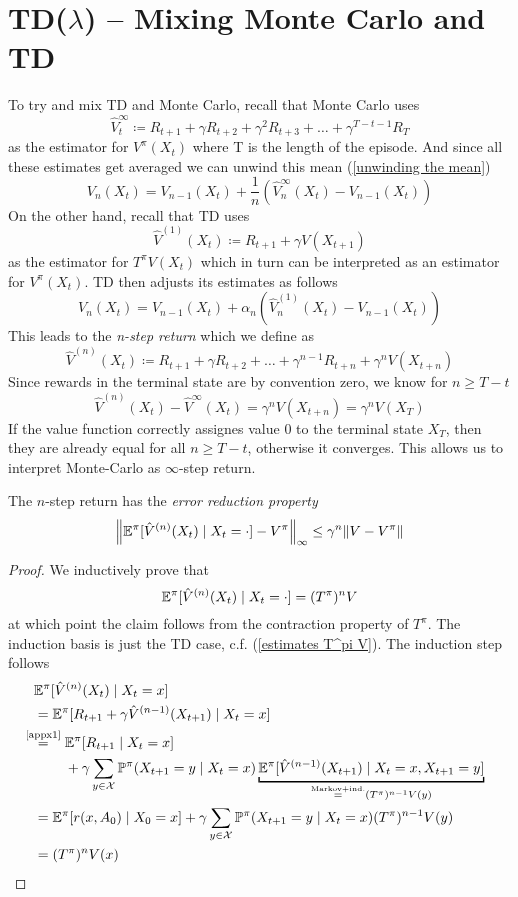 \section{TD(\(\lambda\)) --  Mixing Monte Carlo and TD} 
To try and mix TD and Monte Carlo, recall that Monte Carlo uses 
\[
	\hat{V}^\infty_t \coloneqq R_{t+1} + \gamma R_{t+2} + \gamma^2 R_{t+3} + \dotsc + \gamma^{T-t-1} R_T
\]
as the estimator for \(V^\pi(X_t)\) where T is the length of the episode. And since all these estimates get averaged we can unwind this mean (\ref{unwinding the mean})
\[
	V_n(X_t) = V_{n-1}(X_t) + \frac{1}{n}(\hat{V}_n^\infty (X_t)- V_{n-1}(X_t))
\]
On the other hand, recall that TD uses 
\[
	\hat{V}^{(1)}(X_t)\coloneqq R_{t+1} + \gamma V(X_{t+1})
\]
as the estimator for \(T^\pi V(X_t)\) which in turn can be interpreted as an estimator for \(V^\pi(X_t)\). TD then adjusts its estimates as follows
\[
	V_n(X_t)=V_{n-1}(X_t) + \alpha_n (\hat{V}_n^{(1)}(X_t) - V_{n-1}(X_t))
\]
This leads to the \emph{n-step return} which we define as 
\[
	\hat{V}^{(n)}(X_t)\coloneqq R_{t+1} +\gamma R_{t+2} + \dotsc + \gamma^{n-1}R_{t+n}+ \gamma^n V(X_{t+n})
\]
Since rewards in the terminal state are by convention zero, we know for \(n\ge T-t\)
\[
	\hat{V}^{(n)}(X_t)-\hat{V}^\infty(X_t) = \gamma^n V(X_{t+n}) = \gamma^n V(X_T)
\]
If the value function correctly assignes value \(0\) to the terminal state \(X_T\), then they are already equal for all \(n\ge T-t\), otherwise it converges. This allows us to interpret Monte-Carlo as \(\infty\)-step return.

\begin{lemma} The \(n\)-step return has the \emph{error reduction property}
	\[
		\left\| \mathbb{E}^\pi[ \hat{V}^{(n)}(X_t)\mid X_t=\cdot] - V^\pi\right\|_\infty \le \gamma^n \| V-V^\pi\|
	\]
\end{lemma}
\begin{proof}
	We inductively prove that 
	\[
		\mathbb{E}^\pi[ \hat{V}^{(n)}(X_t)\mid X_t=\cdot]=(T^\pi)^n V
	\]
	at which point the claim follows from the contraction property of \(T^\pi\). The induction basis is just the TD case, c.f. (\ref{estimates T^pi V}). The induction step follows
	\begin{align*}
		&\E^\pi[ \hat{V}^{(n)}(X_t)\mid X_t=x]\\
		&=\E^\pi[R_{t+1}+\gamma\hat{V}^{(n-1)}(X_{t+1})\mid X_t=x]\\
		&\lxeq{\text{\ref{appx1}}}
		\begin{aligned}[t]
			&\E^\pi[R_{t+1}\mid X_t=x] \\
			&+ \gamma\sum_{y\in\cX} \Pr^\pi(X_{t+1}=y\mid X_t=x) 
			\underbracket[1pt]{\E^\pi[\hat{V}^{(n-1)}(X_{t+1})\mid X_t=x,X_{t+1}=y]}_{
				\xeq{\text{Markov+ind.}} (T^\pi)^{n-1} V(y)
			}
		\end{aligned}\\
		&=\E^\pi[r(x,A_0)\mid X_0=x] 
		+\gamma\sum_{y\in\cX} \Pr^\pi(X_{t+1}=y\mid X_t=x)(T^\pi)^{n-1} V(y)\\
		&=(T^\pi)^n V(x) \qedhere
	\end{align*}
\end{proof}

